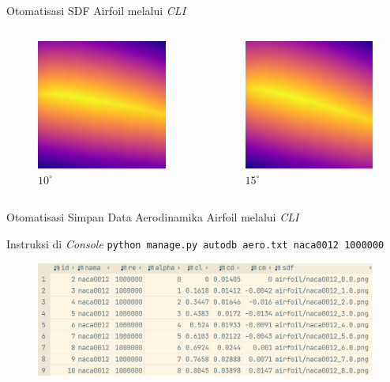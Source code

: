 \begin{frame}{Otomatisasi SDF Airfoil melalui \textit{CLI}}
\begin{columns}[t]
    \begin{column}{.25\linewidth}
      \begin{figure}[h]
        \centering
        \includegraphics[width=0.5\linewidth]{statics/naca0012_10.0}
        \caption{$10^\circ$}
      \end{figure}
    \end{column}

    \begin{column}{.25\linewidth}
      \begin{figure}[h]
        \centering
        \includegraphics[width=0.5\linewidth]{statics/naca0012_15.0}
        \caption{$15^\circ$}
      \end{figure}
    \end{column}
  \end{columns}
\end{frame}

\begin{frame}{Otomatisasi Simpan Data Aerodinamika Airfoil melalui \textit{CLI}}
  \begin{block}{Instruksi di \textit{Console}}
    \texttt{python manage.py autodb aero.txt naca0012 1000000}
  \end{block}

  \begin{figure}[h]
    \centering
    \includegraphics[width=0.7\linewidth]{statics/autoinsert}
  \end{figure}

\end{frame}